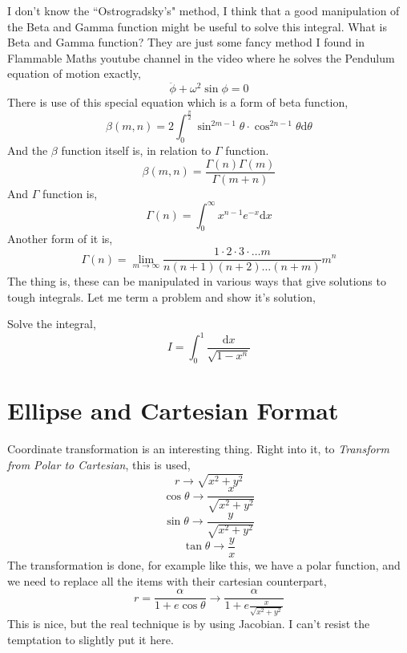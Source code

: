\documentclass[11pt,a4paper]{article}
\newcommand{ \pk }[1]{\begin{problem} #1 \end{problem} }
\begin{document}
I don't know the ``Ostrogradsky's" method, I think that a good manipulation of the Beta and Gamma function might be useful to solve this integral. What is Beta and Gamma function? They are just some fancy method I found in Flammable Maths youtube channel in the video where he solves the Pendulum equation of motion exactly,
\[ 
\ddot{ \phi } + \omega^2 \sin \phi = 0
\]
There is use of this special equation which is a form of beta function,
\[ 
    \beta\left( m,n \right) = 2 \int_{0}^{\frac{\pi}{2}} \sin ^{2m -1} \theta \cdot  \cos ^{2n-1} \theta \mathrm{d} \theta 
\]
And the $\beta$ function itself is, in relation to $\Gamma$ function.
\[ 
    \beta(m,n) = \frac{\Gamma\left( n \right) \Gamma\left( m \right) }{\Gamma\left( m+n \right) }
\]
And $\Gamma$ function is,
\[ 
    \Gamma(n) = \int_{0}^{\infty} x^{n-1} e^{-x} \mathrm{d} x 
\] 
Another form of it is,
\[ 
    \Gamma(n) = \lim_{m \to \infty} \frac{1\cdot 2\cdot 3\cdot \ldots m}{n \left( n+1 \right) \left( n+2 \right) \ldots \left( n+m \right) } m^{n}
\]
The thing is, these can be manipulated in various ways that give solutions to tough integrals. 
Let me term a problem and show it's solution,
\pk{ 
Solve the integral,
\[ 
I = \int_{0}^{1}  \frac{\mathrm{d}  x}{\sqrt{1 - x^{n}} } 
\]
}   

\section{ Ellipse and Cartesian Format }
Coordinate transformation is an interesting thing. Right into it, to \emph{Transform from Polar to Cartesian}, this is used,
\[ 
r \to \sqrt{x^2+ y^2} 
\]
\[ 
\cos \theta \to \frac{x}{\sqrt{x^2 + y^2} }
\]
\[ 
\sin \theta \to \frac{y}{\sqrt{x^2+y^2} }
\]
\[ 
\tan \theta \to \frac{y}{x}          
\]  
The transformation is done, for example like this, we have a polar function, and we need to replace all the items with their cartesian counterpart,
\[ 
 r = \frac{\alpha}{1 + e \cos \theta} \to \frac{\alpha}{1 + e \frac{x}{\sqrt{x^2 + y^2} }}
\]
This is nice, but the real technique is by using Jacobian. I can't resist the temptation to slightly put it here.
\end{document}
